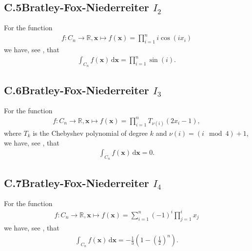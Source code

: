 \documentclass[11pt]{article}
\def\R{\mathbb{R}}
\def\d{\,\mathrm{d}}
\def\bx{\mathbf{x}}
\begin{document}
\subsection*{C.5\hspace{0.5cm}Bratley-Fox-Niederreiter $I_2$}
For the function
\begin{align*}
f\colon C_{n}\to\R, \bx \mapsto f(\bx) = \prod^{n}_{i=1} i\cos(ix_i)
\end{align*}
we have, see \cite[p. 207]{BratleyFoxNiederreiter1992}, that
\begin{align*}
\int_{C_{n}} f(\bx) \d\bx = \prod^{n}_{i=1} \sin(i).
\end{align*}

\subsection*{C.6\hspace{0.5cm}Bratley-Fox-Niederreiter $I_3$}
For the function
\begin{align*}
f\colon C_{n}\to\R, \bx \mapsto f(\bx) = \prod^{n}_{i=1} T_{\nu(i)}(2x_i-1),
\end{align*}
where $T_k$ is the Chebyshev polynomial of degree $k$ and $\nu(i) = (i \mod 4) + 1$,
we have, see \cite[p. 207]{BratleyFoxNiederreiter1992}, that
\begin{align*}
\int_{C_{n}} f(\bx) \d\bx = 0.
\end{align*}

\subsection*{C.7\hspace{0.5cm}Bratley-Fox-Niederreiter $I_4$}
For the function
\begin{align*}
f\colon C_{n}\to\R, \bx \mapsto f(\bx) = \sum^{n}_{i=1} (-1)^i \prod_{j=1}^{i} x_j
\end{align*}
we have, see \cite[p. 207]{BratleyFoxNiederreiter1992}, that
\begin{align*}
\int_{C_{n}} f(\bx) \d\bx = -\frac{1}{3}\left(1-\left(\frac{1}{2}\right)^n\right).
\end{align*}
%
%
\end{document}
